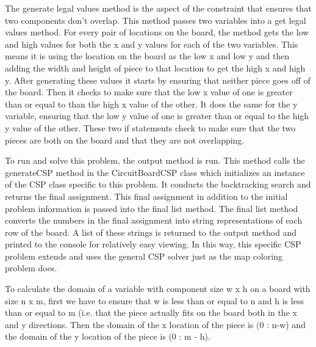 \documentclass{article}
\begin{document}
The generate legal values method is the aspect of the constraint that ensures that two components don't overlap. This method passes two variables into a get legal values method. For every pair of locations on the board, the method gets the low and high values for both the x and y values for each of the two variables. This means it is using the location on the board as the low x and low y and then adding the width and height of piece to that location to get the high x and high y. After generating these values it starts by ensuring that neither piece goes off of the board. Then it checks to make sure that the low x value of one is greater than or equal to than the high x value of the other. It does the same for the y variable, ensuring that the low y value of one is greater than or equal to the high y value of the other. These two if statements check to make sure that the two pieces are both on the board and that they are not overlapping. 

To run and solve this problem, the output method is run. This method calls the generateCSP method in the CircuitBoardCSP class which initializes an instance of the CSP class specific to this problem. It conducts the backtracking search and returns the final assignment. This final assignment in addition to the initial problem information is passed into the final list method. The final list method converts the numbers in the final assignment into string representations of each row of the board. A list of these strings is returned to the output method and printed to the console for relatively easy viewing. In this way, this specific CSP problem extends and uses the general CSP solver just as the map coloring problem does. 

To calculate the domain of a variable with component size w x h on a board with size n x m, first we have to ensure that w is less than or equal to n and h is less than or equal to m (i.e. that the piece actually fits on the board both in the x and y directions. Then the domain of the x location of the piece is (0 : n-w) and the domain of the y location of the piece is (0 : m - h). 
\end{document}
